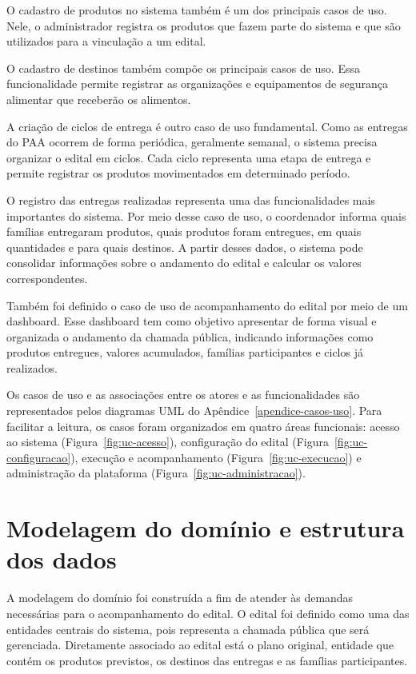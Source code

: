 \documentclass[grad,pdftex]{poli}
\begin{document}
O cadastro de produtos no sistema também é um dos principais casos de uso. Nele, o administrador registra os produtos que fazem parte do sistema e que são utilizados para a vinculação a um edital.

O cadastro de destinos também compõe os principais casos de uso. Essa funcionalidade permite registrar as organizações e equipamentos de segurança alimentar que receberão os alimentos.

A criação de ciclos de entrega é outro caso de uso fundamental. Como as entregas do PAA ocorrem de forma periódica, geralmente semanal, o sistema precisa organizar o edital em ciclos. Cada ciclo representa uma etapa de entrega e permite registrar os produtos movimentados em determinado período.

O registro das entregas realizadas representa uma das funcionalidades mais importantes do sistema. Por meio desse caso de uso, o coordenador informa quais famílias entregaram produtos, quais produtos foram entregues, em quais quantidades e para quais destinos. A partir desses dados, o sistema pode consolidar informações sobre o andamento do edital e calcular os valores correspondentes.

Também foi definido o caso de uso de acompanhamento do edital por meio de um dashboard. Esse dashboard tem como objetivo apresentar de forma visual e organizada o andamento da chamada pública, indicando informações como produtos entregues, valores acumulados, famílias participantes e ciclos já realizados.


Os casos de uso e as associações entre os atores e as funcionalidades são representados pelos diagramas UML do Apêndice~\ref{apendice-casos-uso}. Para facilitar a leitura, os casos foram organizados em quatro áreas funcionais: acesso ao sistema (Figura~\ref{fig:uc-acesso}), configuração do edital (Figura~\ref{fig:uc-configuracao}), execução e acompanhamento (Figura~\ref{fig:uc-execucao}) e administração da plataforma (Figura~\ref{fig:uc-administracao}).

\section{Modelagem do domínio e estrutura dos dados}

A modelagem do domínio foi construída a fim de atender às demandas necessárias para o acompanhamento do edital. O edital foi definido como uma das entidades centrais do sistema, pois representa a chamada pública que será gerenciada. Diretamente associado ao edital está o plano original, entidade que contém os produtos previstos, os destinos das entregas e as famílias participantes.
\end{document}
